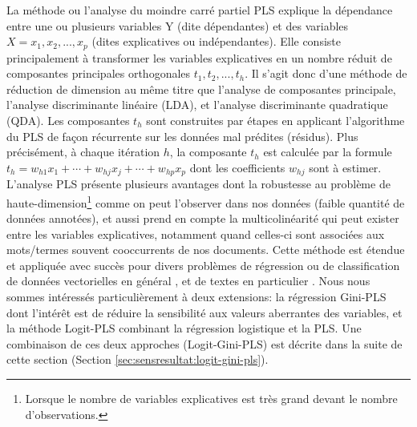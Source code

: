 La méthode ou l'analyse du moindre carré partiel PLS  \citep{wold1966pls} explique la dépendance entre une ou plusieurs variables Y (dite dépendantes) et des variables $X=x_1,x_2,...,x_p$ (dites explicatives ou indépendantes). Elle consiste principalement à transformer les variables explicatives en un nombre réduit de composantes principales orthogonales $t_1, t_2, ..., t_h$. Il s'agit donc d'une méthode de réduction de dimension au même titre que l'analyse de composantes principale, l'analyse discriminante linéaire (LDA), et l'analyse discriminante quadratique (QDA). Les composantes $t_h$ sont construites par étapes en applicant l'algorithme du PLS de façon récurrente sur les données mal prédites (résidus). Plus précisément, à chaque itération $h$, la composante $t_h$ est calculée par la formule $t_h = w_{h1} x_1 + \cdots + w_{hj} x_j + \cdots + w_{hp} x_p$ dont les coefficients $w_{hj}$ sont à estimer. L'analyse PLS présente plusieurs avantages \citep{lacroux2011avantagesPLS} dont la robustesse au problème de haute-dimension\footnote{Lorsque le nombre de variables explicatives est très grand devant le nombre d'observations.} comme on peut l'observer dans nos données (faible quantité de données annotées), et aussi prend en compte la multicolinéarité qui peut exister entre les variables explicatives, notamment quand celles-ci sont associées aux mots/termes souvent cooccurrents de nos documents. Cette méthode est étendue et appliquée avec succès pour divers problèmes de régression \citep{lacroux2011avantagesPLS}
 ou de  classification de données vectorielles en général \citep{liu2007pls4classif,durif2017sparsePLSandLogit, bazzoli2018classificationwithLS-PLS}, et de textes en particulier \citep{zeng2007textclassPLS}.
Nous nous sommes intéressés particulièrement à deux extensions: la régression Gini-PLS \citep{mussard2018ginipls} dont l'intérêt est de réduire la sensibilité aux valeurs aberrantes des variables, et la méthode Logit-PLS \citep{tenenhaus2005logitpls}  combinant la régression logistique et la PLS. Une combinaison de ces deux approches (Logit-Gini-PLS) est décrite dans la suite de cette section (Section \ref{sec:sensresultat:logit-gini-pls}).


